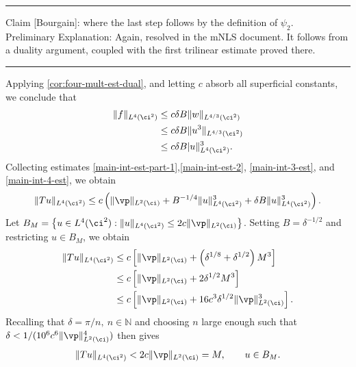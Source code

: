%
%
\hrule
Claim [Bourgain]: where the last step follows by the definition of 
$\psi_2$. 
\\
Preliminary Explanation: Again, resolved in the mNLS document. It follows from a 
duality argument, coupled with the first trilinear estimate proved there. \\
\hrule
Applying \cref{cor:four-mult-est-dual}, and letting $c$ absorb all 
superficial constants, we conclude
that 
%
%
\begin{equation}
	\label{main-int-4-est}
	\begin{split}
		\|f\|_{L^4(\ci^2)}
		& \le c \delta B \|w\|_{L^{4/3}(\ci^2)}
		\\
		& \le c \delta B \|u^3\|_{L^{4/3}(\ci^2)}
		\\
		& \le c \delta B |u\|_{L^4(\ci^2)}^3.
	\end{split}
\end{equation}
%
%
Collecting estimates \eqref{main-int-est-part-1},\eqref{main-int-est-2}, 
\eqref{main-int-3-est}, and \eqref{main-int-4-est}, we obtain
%
%
\begin{equation}
	\label{1gh}
	\begin{split}
		\|Tu\|_{L^4(\ci^2)} \le c\left( \|\vp\|_{L^2(\ci)}
		+ B^{-1/4} \|u\|_{L^4(\ci^2)}^3 + \delta B \|u\|_{L^4(\ci^2)}^3 \right).
	\end{split}
\end{equation}
%
%
Let $B_M = \left\{ u \in L^4(\ci^2): \|u\|_{L^4(\ci^2)} \le 2c \|\vp 
\|_{L^2(\ci)} \right\}$. Setting $B = \delta^{-1/2}$ and restricting $u \in B_M$, we 
obtain %
%
\begin{equation*}
	\begin{split}
		\|Tu\|_{L^4(\ci^2)}
		& \le c \left[ \|\vp\|_{L^2(\ci)} + \left( \delta^{1/8} 
		+ \delta^{1/2} \right) M^3 \right]
		\\
		& \le c \left[ \|\vp\|_{L^2(\ci)} + 2 \delta^{1/2} M^3 \right]
		\\
		& \le c \left[ \|\vp\|_{L^2(\ci)} + 16c^3 \delta^{1/2} \|\vp\|_{L^2(\ci)}^3 
		\right].
	\end{split}
\end{equation*}
%
Recalling that  $\delta = \pi/n, \ n \in \mathbb{N}$ and choosing $n$ large enough 
such that $\delta < 1/(10^6 c^6 \|\vp\|_{L^2(\ci)}^4)$ then gives
%
%
\begin{equation}
	\label{ball-to-ball}
	\begin{split}
		\|Tu\|_{L^4(\ci^2)} < 2c\|\vp\|_{L^2(\ci)} = M, \qquad u \in B_M.
	\end{split}
\end{equation}
